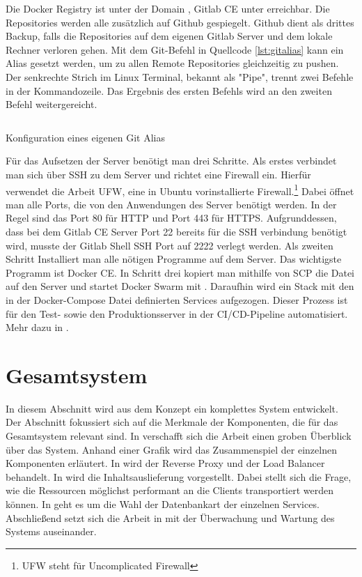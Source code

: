 Die Docker Registry ist unter der Domain , Gitlab CE
unter  erreichbar. Die Repositories werden alle zusätzlich
auf Github gespiegelt. Github dient als drittes Backup, falls die Repositories auf dem
eigenen Gitlab Server und dem lokale Rechner verloren gehen. Mit dem Git-Befehl in
Quellcode \ref{lst:gitalias} kann ein Alias gesetzt werden, um zu allen Remote Repositories
gleichzeitig zu pushen. Der senkrechte Strich im Linux Terminal, bekannt als "Pipe",
trennt zwei Befehle in der Kommandozeile. Das Ergebnis des ersten Befehls wird
an den zweiten Befehl weitergereicht.

\begin{listing}
    \inputminted{sh}{snippets/sh/pushall.sh}
    \caption{Konfiguration eines eigenen Git Alias}
    \label{lst:gitalias}
\end{listing}

Für das Aufsetzen der Server benötigt man drei Schritte.
Als erstes verbindet man sich über SSH zu dem Server und richtet eine Firewall ein.
Hierfür verwendet die Arbeit UFW, eine in Ubuntu vorinstallierte
Firewall.\footnote{UFW steht für Uncomplicated Firewall} Dabei öffnet man alle Ports,
die von den Anwendungen des Server benötigt werden. In der Regel sind das Port 80
für HTTP und Port 443 für HTTPS. Aufgrunddessen, dass bei dem Gitlab CE Server
Port 22 bereits für die SSH verbindung benötigt wird, musste der Gitlab Shell SSH
Port auf 2222 verlegt werden. Als zweiten Schritt Installiert man alle nötigen
Programme auf dem Server. Das wichtigste Programm ist Docker CE. In Schritt
drei kopiert man mithilfe von SCP die  Datei auf den
Server und startet Docker Swarm mit . Daraufhin wird
ein Stack mit den in der Docker-Compose Datei definierten Services aufgezogen.
Dieser Prozess ist für den Test- sowie den Produktionsserver in der CI/CD-Pipeline
automatisiert. Mehr dazu in .

\section{Gesamtsystem}
\label{sec:gesamtsysten}
In diesem Abschnitt wird aus dem Konzept ein komplettes System
entwickelt. Der Abschnitt fokussiert sich auf die Merkmale der Komponenten,
die für das Gesamtsystem relevant sind. In  verschafft
sich die Arbeit einen groben Überblick über das System. Anhand einer Grafik wird das Zusammenspiel
der einzelnen Komponenten erläutert. In  
wird der Reverse Proxy und der Load Balancer behandelt. In  wird
die Inhaltsauslieferung vorgestellt. Dabei stellt sich die Frage,
wie die Ressourcen möglichst performant an die Clients transportiert
werden können. In  geht es um die Wahl
der Datenbankart der einzelnen Services. Abschließend setzt sich die Arbeit
in  mit der Überwachung und Wartung
des Systems auseinander.

